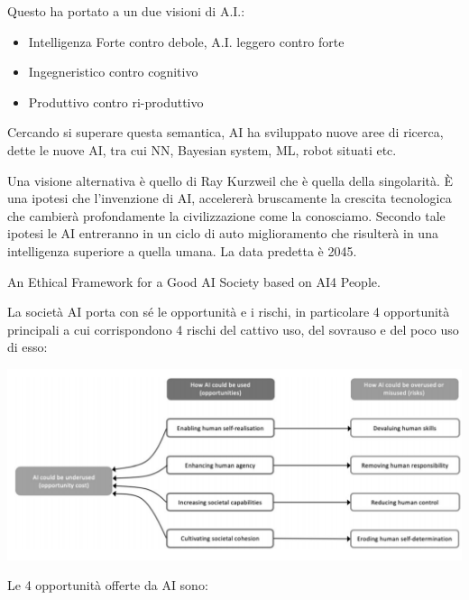\documentclass[a4page, 11pt]{article}
\begin{document}
Questo ha portato a un due visioni di A.I.:

\begin{itemize}
	 
	\item
	Intelligenza Forte contro debole, A.I. leggero contro forte
	\item
	Ingegneristico contro cognitivo
	\item
	Produttivo contro ri-produttivo
\end{itemize}

Cercando si superare questa semantica, AI ha sviluppato nuove aree di
ricerca, dette le nuove AI, tra cui NN, Bayesian system, ML, robot
situati etc.

Una visione alternativa è quello di Ray Kurzweil che è quella della
singolarità. È una ipotesi che l'invenzione di AI, accelererà
bruscamente la crescita tecnologica che cambierà profondamente la
civilizzazione come la conosciamo. Secondo tale ipotesi le AI entreranno
in un ciclo di auto miglioramento che risulterà in una intelligenza
superiore a quella umana. La data predetta è 2045.

An Ethical Framework for a Good AI Society based on AI4 People.

La società AI porta con sé le opportunità e i rischi, in particolare 4
opportunità principali a cui corrispondono 4 rischi del cattivo uso, del
sovrauso e del poco uso di esso:
\begin{center}
	\includegraphics[scale=0.4]{image3.png}
\end{center}


Le 4 opportunità offerte da AI sono:
\end{document}
